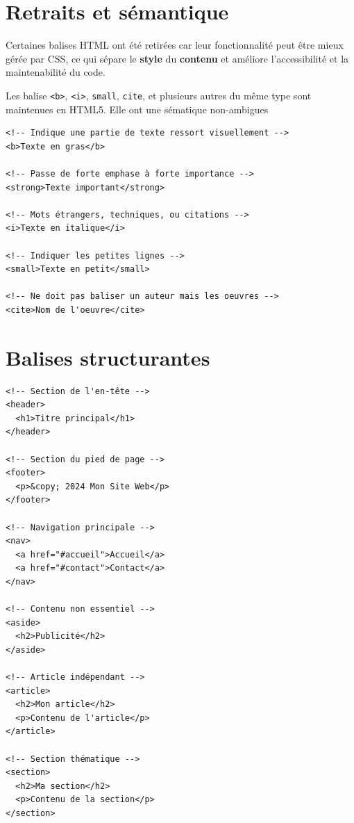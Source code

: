\documentclass{report}
\begin{document}
\begin{multicols*}{2}
\section{Retraits et sémantique}
 Certaines balises HTML ont été retirées car leur fonctionnalité peut être mieux gérée par CSS, ce qui sépare 
 le \textbf{style} du \textbf{contenu} et améliore l'accessibilité et la maintenabilité du code.


\begin{note}{}{}
    Les balise \texttt{<b>}, \texttt{<i>}, \texttt{small}, \texttt{cite}, et plusieurs autres 
    du même type sont maintenues 
    en HTML5. Elle ont une sématique non-ambigues
\end{note}
\begin{lstlisting}[style=HTMLDraculaDark]
<!-- Indique une partie de texte ressort visuellement -->
<b>Texte en gras</b>

<!-- Passe de forte emphase à forte importance -->
<strong>Texte important</strong>

<!-- Mots étrangers, techniques, ou citations -->
<i>Texte en italique</i>

<!-- Indiquer les petites lignes -->
<small>Texte en petit</small>

<!-- Ne doit pas baliser un auteur mais les oeuvres -->
<cite>Nom de l'oeuvre</cite>
\end{lstlisting}




\section{Balises structurantes}

\begin{lstlisting}[style=HTMLDraculaDark]
<!-- Section de l'en-tête -->
<header>
  <h1>Titre principal</h1>
</header>

<!-- Section du pied de page -->
<footer>
  <p>&copy; 2024 Mon Site Web</p>
</footer>

<!-- Navigation principale -->
<nav>
  <a href="#accueil">Accueil</a>
  <a href="#contact">Contact</a>
</nav>

<!-- Contenu non essentiel -->
<aside>
  <h2>Publicité</h2>
</aside>

<!-- Article indépendant -->
<article>
  <h2>Mon article</h2>
  <p>Contenu de l'article</p>
</article>

<!-- Section thématique -->
<section>
  <h2>Ma section</h2>
  <p>Contenu de la section</p>
</section>
\end{lstlisting}


\end{multicols*}
\end{document}
